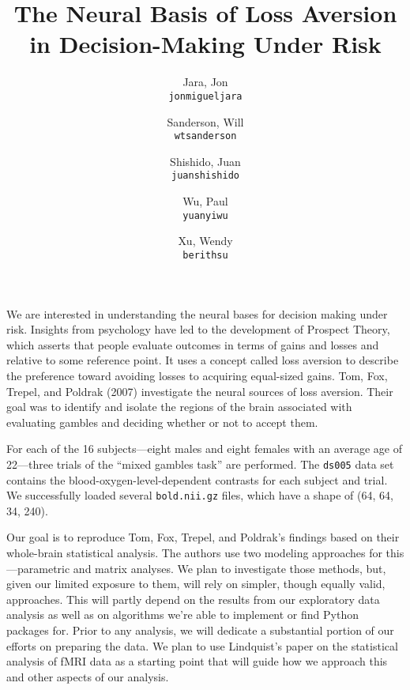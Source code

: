 \documentclass[11pt]{article}
\title{The Neural Basis of Loss Aversion in Decision-Making Under Risk}
\author{
  Jara, Jon\\
  \texttt{jonmigueljara}
  \and
  Sanderson, Will\\
  \texttt{wtsanderson}
  \and
  Shishido, Juan\\
  \texttt{juanshishido}
  \and
  Wu, Paul\\
  \texttt{yuanyiwu}
  \and
  Xu, Wendy\\
  \texttt{berithsu}
}
\begin{document}
\maketitle

We are interested in understanding the neural bases for decision making under
risk. Insights from psychology have led to the development of Prospect Theory,
which asserts that people evaluate outcomes in terms of gains and losses and
relative to some reference point\cite{kahnemantversky}. It uses a concept
called loss aversion to describe the preference toward avoiding losses to
acquiring equal-sized gains. Tom, Fox, Trepel, and Poldrak (2007) investigate
the neural sources of loss aversion. Their goal was to identify and isolate the
regions of the brain associated with evaluating gambles and deciding whether or
not to accept them.

For each of the 16 subjects---eight males and eight females with an average
age of 22---three trials of the ``mixed gambles task'' are performed. The
\lstinline{ds005} data set contains the blood-oxygen-level-dependent contrasts
for each subject and trial. We successfully loaded several
\lstinline{bold.nii.gz} files, which have a shape of (64, 64, 34, 240).

Our goal is to reproduce Tom, Fox, Trepel, and Poldrak's findings based on
their whole-brain statistical analysis. The authors use two modeling approaches
for this---parametric and matrix analyses. We plan to investigate those
methods, but, given our limited exposure to them, will rely on simpler, though
equally valid, approaches. This will partly depend on the results from our
exploratory data analysis as well as on algorithms we're able to implement or
find Python packages for. Prior to any analysis, we will dedicate a substantial
portion of our efforts on preparing the data. We plan to use Lindquist's paper
on the statistical analysis of fMRI data\cite{lindquist} as a starting point
that will guide how we approach this and other aspects of our analysis.


\end{document}
